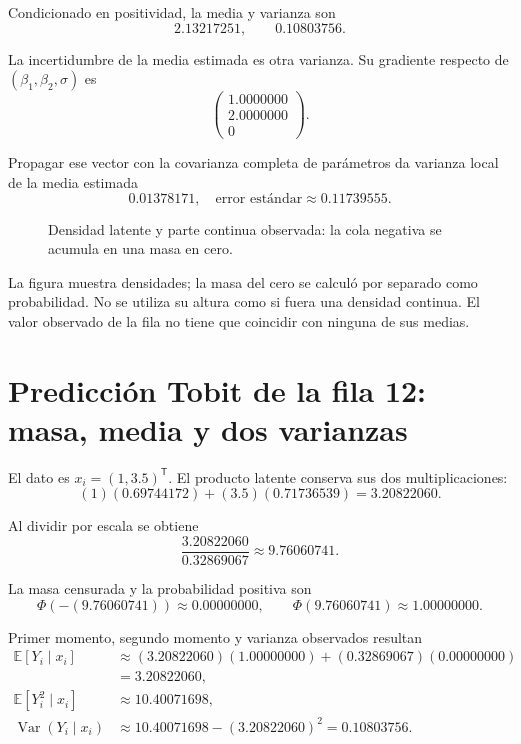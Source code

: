 \documentclass[11pt,a4paper]{article}
\newcommand{\E}{\mathbb E}
\newcommand{\T}{^{\mathsf T}}
\DeclareMathOperator{\Var}{Var}
\begin{document}
Condicionado en positividad,
la media y varianza son
\[
2.13217251,\qquad 0.10803756.
\]

La incertidumbre de la media estimada
es otra varianza.
Su gradiente respecto de
\((\beta_1,\beta_2,\sigma)\) es
\[
\begin{pmatrix}1.0000000\\2.0000000\\0\end{pmatrix}.
\]

Propagar ese vector con la
covarianza completa de parámetros
da varianza local de la
media estimada
\[
0.01378171,\quad\text{error estándar}\approx0.11739555.
\]

\begin{figure}[H]\centering
{}
\caption{Densidad latente y parte continua observada: la cola negativa se acumula en una masa en cero.}
\end{figure}

La figura muestra densidades;
la masa del cero se calculó
por separado como probabilidad.
No se utiliza su altura
como si fuera una densidad continua.
El valor observado de la fila
no tiene que coincidir
con ninguna de sus medias.

\clearpage
\section{Predicción Tobit de la fila 12: masa, media y dos varianzas}\label{unidad119}
El dato es \(x_i=(1,3.5)\T\).
El producto latente conserva
sus dos multiplicaciones:
\[
(1)(0.69744172)+(3.5)(0.71736539)=3.20822060.
\]

Al dividir por escala se obtiene
\[
\frac{3.20822060}{0.32869067}\approx9.76060741.
\]

La masa censurada y la
probabilidad positiva son
\[
\Phi(-(9.76060741))\approx0.00000000,\qquad\Phi(9.76060741)\approx1.00000000.
\]

Primer momento, segundo momento
y varianza observados resultan
\[
\begin{aligned}
\E[Y_i\mid x_i]&\approx(3.20822060)(1.00000000)+(0.32869067)(0.00000000)\\
&=3.20822060,\\
\E[Y_i^2\mid x_i]&\approx10.40071698,\\
\Var(Y_i\mid x_i)&\approx10.40071698-(3.20822060)^2=0.10803756.\end{aligned}
\]
\end{document}
